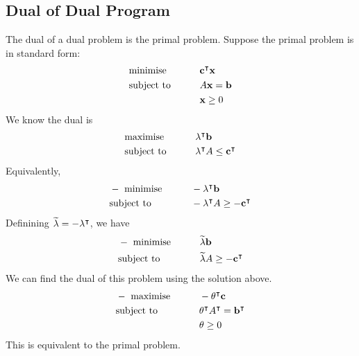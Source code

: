 \subsection{Dual of Dual Program}
The dual of a dual problem is the primal problem.
Suppose the primal problem is in standard form:
\begin{alignat*}{2}
    & \text{minimise} & \qquad & \vb c^\intercal \vb x     \\
    & \text{subject to}                             &        & A \vb x = \vb b   \\
    &                                               &        & \vb x \geq 0
\end{alignat*}
We know the dual is
\begin{alignat*}{2}
    & \text{maximise} & \qquad & \vb \lambda^\intercal \vb b     \\
    & \text{subject to}                             &        & \vb \lambda^\intercal A \leq \vb c^\intercal \\
\end{alignat*}
Equivalently,
\begin{alignat*}{2}
    & -\text{ minimise} & \qquad & -\vb \lambda^\intercal \vb b     \\
    & \text{subject to}                             &        & -\vb \lambda^\intercal A \geq -\vb c^\intercal \\
\end{alignat*}
Definining \( \widetilde{\vb \lambda} = -\vb\lambda^\intercal \), we have
\begin{alignat*}{2}
    & -\text{ minimise} & \qquad & \widetilde{\vb \lambda} \vb b     \\
    & \text{subject to}                             &        & \widetilde{\vb \lambda} A \geq -\vb c^\intercal \\
\end{alignat*}
We can find the dual of this problem using the solution above.
\begin{alignat*}{2}
    & -\text{ maximise} & \qquad & -\vb \theta^\intercal \vb c     \\
    & \text{subject to}                             &        & \vb \theta^\intercal A^\intercal = \vb b^\intercal \\
    & & & \vb \theta \geq 0
\end{alignat*}
This is equivalent to the primal problem.

